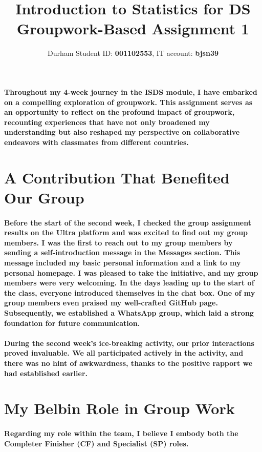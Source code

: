\documentclass[11pt]{article} %
\title{Introduction to Statistics for DS \\ 
Groupwork-Based Assignment 1}
\author{Durham Student ID: \textbf{001102553}, IT account: \textbf{bjsn39}}
\begin{document}
\maketitle

% 
% 
% 
% 
\paragraph{Throughout my 4-week journey in the ISDS module, I have embarked on a compelling exploration of groupwork. This assignment serves as an opportunity to reflect on the profound impact of groupwork, recounting experiences that have not only broadened my understanding but also reshaped my perspective on collaborative endeavors with classmates from different countries.}
% 
% 
\section{A Contribution That Benefited Our Group}
% 
\paragraph{Before the start of the second week, I checked the group assignment results on the Ultra platform and was excited to find out my group members. I was the first to reach out to my group members by sending a self-introduction message in the Messages section. This message included my basic personal information and a link to my personal homepage. I was pleased to take the initiative, and my group members were very welcoming. In the days leading up to the start of the class, everyone introduced themselves in the chat box. One of my group members even praised my well-crafted GitHub page. Subsequently, we established a WhatsApp group, which laid a strong foundation for future communication.}
% 
\paragraph{During the second week's ice-breaking activity, our prior interactions proved invaluable. We all participated actively in the activity, and there was no hint of awkwardness, thanks to the positive rapport we had established earlier.}
% 
% 
% 
% 
\section{My Belbin Role in Group Work}
% 
\paragraph{Regarding my role within the team, I believe I embody both the \textbf{Completer Finisher} (CF) and \textbf{Specialist} (SP) roles.}
% 
\end{document}
